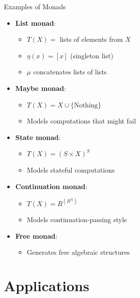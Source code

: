 \documentclass{beamer}
\begin{document}
    \begin{frame}{Examples of Monads}
    \begin{itemize}
        \item \textbf{List monad}:
            \begin{itemize}
                \item $T(X) = $ lists of elements from $X$
                \item $\eta(x) = [x]$ (singleton list)
                \item $\mu$ concatenates lists of lists
            \end{itemize}
        \item \textbf{Maybe monad}:
            \begin{itemize}
                \item $T(X) = X \cup \{\text{Nothing}\}$
                \item Models computations that might fail
            \end{itemize}
        \item \textbf{State monad}:
            \begin{itemize}
                \item $T(X) = (S \times X)^S$
                \item Models stateful computations
            \end{itemize}
        \item \textbf{Continuation monad}:
            \begin{itemize}
                \item $T(X) = R^{(R^X)}$
                \item Models continuation-passing style
            \end{itemize}
        \item \textbf{Free monad}:
            \begin{itemize}
                \item Generates free algebraic structures
            \end{itemize}
    \end{itemize}
    \end{frame}
    
    \section{Applications}
    
\end{document}
